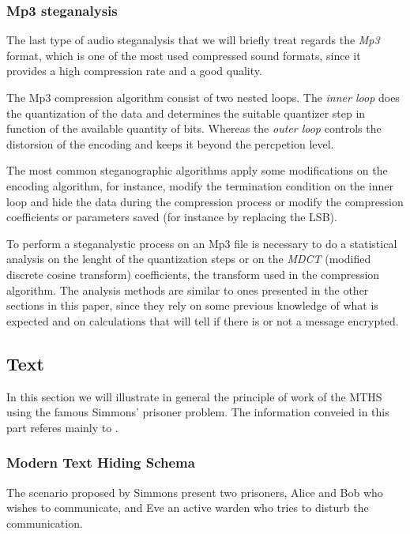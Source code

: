 \documentclass[../../main.tex]{subfiles}
\begin{document}
    \subsubsection{Mp3 steganalysis}
    The last type of audio steganalysis that we will briefly treat regards the
    \emph{Mp3} format, which is one of the most used compressed sound formats,
    since it provides a high compression rate and a good quality.
    
    The Mp3 compression algorithm consist of two nested loops.
    The \emph{inner loop} does the quantization of the data and determines the
    suitable quantizer step in function of the available quantity of bits.
    Whereas the \emph{outer loop} controls the distorsion of the encoding and
    keeps it beyond the percpetion level.

    The most common steganographic algorithms apply some modifications on the
    encoding algorithm, for instance, modify the termination condition on the
    inner loop and hide the data during the compression process or modify the
    compression coefficients or parameters saved (for instance by replacing the
    LSB).

    To perform a steganalystic process on an Mp3 file is necessary to do a
    statistical analysis on the lenght of the quantization steps or on the
    \emph{MDCT} (modified discrete cosine transform) coefficients, the transform
    used in the compression algorithm.
    The analysis methods are similar to ones presented in the other sections in
    this paper, since they rely on some previous knowledge of what is expected
    and on calculations that will tell if there is or not a message encrypted.


    

    \subsection{Text}
    In this section we will illustrate in general the principle of work of the
    MTHS using the famous Simmons' prisoner problem.
    The information conveied in this part referes mainly to
    \cite{modern-text-hiding}.
    \subsubsection{Modern Text Hiding Schema}
    The scenario proposed by Simmons present two prisoners, Alice and Bob who
    wishes to communicate, and Eve an active warden who tries to disturb the
    communication.
    
\end{document}
